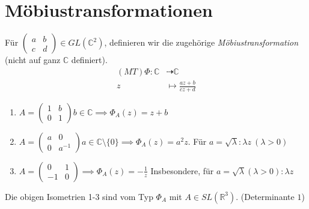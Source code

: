 \documentclass[../main.tex]{subfiles}
\begin{document}
\section{Möbiustransformationen}
\begin{recall}
    Für $\begin{pmatrix}
        a & b \\ c & d
    \end{pmatrix} \in GL(\mathbb{C}^2)$, definieren wir die zugehörige \emph{Möbiustransformation} (nicht auf ganz $\mathbb{C}$ definiert).
    \begin{align*}
        (MT) \Phi : \mathbb{C} & \dashrightarrow \mathbb{C} \\
            z & \mapsto \frac{az+b}{cz+d}
    \end{align*}

\end{recall}

\begin{examples}
    \leavevmode
    \begin{enumerate}
        \item $A = \begin{pmatrix}
            1 & b \\ 0 & 1
        \end{pmatrix} b \in \mathbb{C} \implies \Phi _A (z)=z+b$

        \item $A = \begin{pmatrix}
            a & 0 \\ 0 & a^{-1}
        \end{pmatrix} a \in \mathbb{C}\setminus \{0\} \implies  \Phi _A (z)=a^2z$.
        Für $a = \sqrt{\lambda}: \lambda z \ (\lambda > 0)$

        \item $A = \begin{pmatrix}
            0 & 1 \\ -1 & 0
        \end{pmatrix} \implies \Phi _A (z)= -\frac{1}{z}$
        Insbesondere, für $a = \sqrt{\lambda} (\lambda > 0): \lambda z$
    \end{enumerate}
\end{examples}

\begin{remark}
    Die obigen Isometrien 1-3 sind vom Typ $\Phi _A$ mit $A \in SL(\mathbb{R}^3)$.
    (Determinante $1$)
\end{remark}
\end{document}
